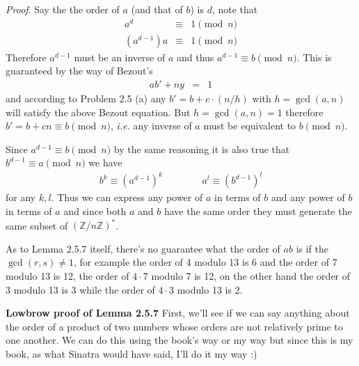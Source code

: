 \documentclass[aps,preprint,preprintnumbers,nofootinbib,showpacs,prd]{revtex4-1}
\newcommand{\ie}{{\it i.e.} }
\newcommand{\nbea}{\begin{eqnarray*}}
\newcommand{\neea}{\end{eqnarray*}}
\begin{document}
{\it Proof}. Say the the order of $a$ (and that of $b$) is $d$, note that
%
\nbea
a^d & \equiv & 1 \pmod{n} \\
(a^{d-1}) a & \equiv & 1 \pmod{n}
\neea
%
Therefore $a^{d-1}$ must be an inverse of $a$ and thus $a^{d-1} \equiv b \pmod{n}$. This is guaranteed by the way of Bezout's
%
\nbea
ab' + ny & = & 1
\neea
%
and according to Problem 2.5 (a) any $b' = b + c \cdot (n/h)$ with $h = \gcd(a,n)$ will satisfy the above Bezout equation. But $h = \gcd(a,n) = 1$ therefore $b' = b + cn \equiv b \pmod{n}$, \ie any inverse of $a$ must be equivalent to $b \pmod{n}$.

Since $a^{d-1} \equiv b \pmod{n}$ by the same reasoning it is also true that $b^{d-1} \equiv a \pmod{n}$ we have
%
\nbea
b^k \equiv (a^{d-1})^k & ~~~~~~~~~~~ & a^l \equiv (b^{d-1})^l
\neea
%
for any $k, l$. Thus we can express any power of $a$ in terms of $b$ and any power of $b$ in terms of $a$ and since both $a$ and $b$ have the same order they must generate the same subset of $(\mathbb{Z}/n\mathbb{Z})^*$.
 
As to Lemma 2.5.7 itself, there's no guarantee what the order of $ab$ is if the $\gcd(r,s) \neq 1$, for example the order of 4 modulo 13 is 6 and the order of 7 modulo 13 is 12, the order of $4\cdot 7$ modulo 7 is 12, on the other hand the order of 3 modulo 13 is 3 while the order of $4 \cdot 3$ modulo 13 is 2.

{\bf Lowbrow proof of Lemma 2.5.7} First, we'll see if we can say anything about the order of a product of two numbers whose orders are not relatively prime to one another. We can do this using the book's way or my way but since this is my book, as what Sinatra would have said, I'll do it my way :)
\end{document}
